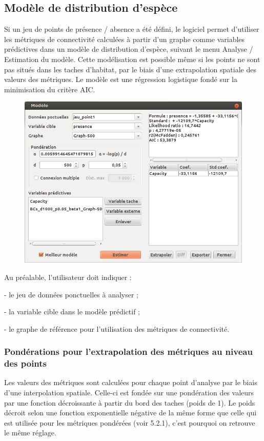 \documentclass{article}
\begin{document}
\subsection{Modèle de distribution d’espèce}
\label{sdm}

Si un jeu de points de présence / absence a été défini, le logiciel permet d’utiliser les métriques de connectivité calculées à partir d’un graphe comme variables prédictives dans un modèle de distribution d’espèce, suivant le menu Analyse / Estimation du modèle. Cette modélisation est possible même si les points ne sont pas situés dans les taches d’habitat, par le biais d’une extrapolation spatiale des valeurs des métriques. Le modèle est une régression logistique fondé sur la minimisation du critère AIC.

\begin{figure}[H]
	\includegraphics[scale=0.5]{img/manual-fr_img15.png} 
\end{figure}

Au préalable, l’utilisateur doit indiquer :

{}- le jeu de données ponctuelles à analyser ;

{}- la variable cible dans le modèle prédictif ;

{}- le graphe de référence pour l’utilisation des métriques de connectivité.

\subsubsection{Pondérations pour l’extrapolation des métriques au niveau des points}
Les valeurs des métriques sont calculées pour chaque point d’analyse par le biais d’une interpolation spatiale. Celle-ci est fondée sur une pondération des valeurs par une fonction décroissante à partir du bord des taches (poids de 1). Le poids décroit selon une fonction exponentielle négative de la même forme que celle qui est utilisée pour les métriques pondérées (voir 5.2.1), c’est pourquoi on retrouve le même réglage.
\end{document}

